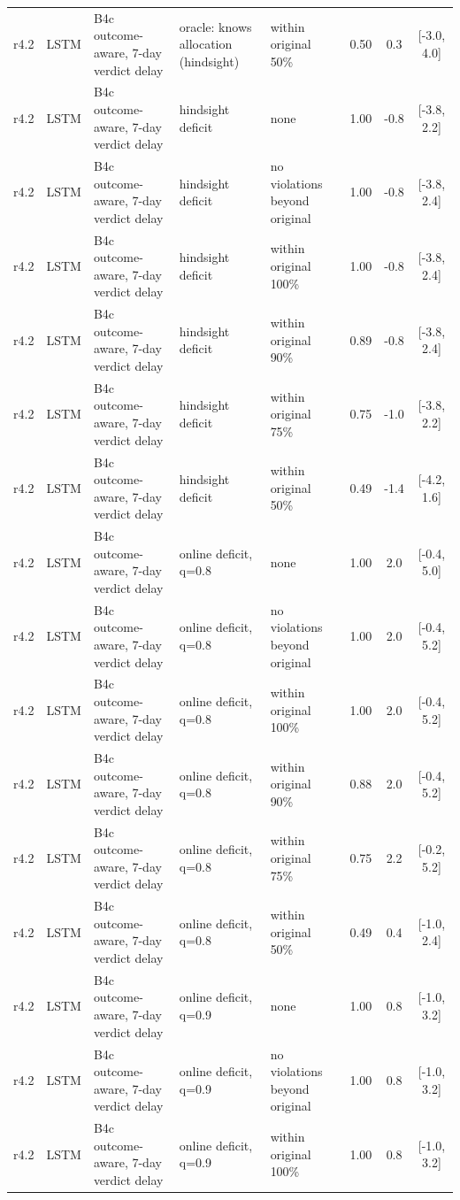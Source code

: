 \begin{longtable}{lllp{4.2cm}p{3.4cm}ccc}
r4.2 & LSTM & B4c outcome-aware, 7-day verdict delay & oracle: knows allocation (hindsight) & within original 50\% & 0.50 & 0.3 & [-3.0, 4.0] \\
r4.2 & LSTM & B4c outcome-aware, 7-day verdict delay & hindsight deficit & none & 1.00 & -0.8 & [-3.8, 2.2] \\
r4.2 & LSTM & B4c outcome-aware, 7-day verdict delay & hindsight deficit & no violations beyond original & 1.00 & -0.8 & [-3.8, 2.4] \\
r4.2 & LSTM & B4c outcome-aware, 7-day verdict delay & hindsight deficit & within original 100\% & 1.00 & -0.8 & [-3.8, 2.4] \\
r4.2 & LSTM & B4c outcome-aware, 7-day verdict delay & hindsight deficit & within original 90\% & 0.89 & -0.8 & [-3.8, 2.4] \\
r4.2 & LSTM & B4c outcome-aware, 7-day verdict delay & hindsight deficit & within original 75\% & 0.75 & -1.0 & [-3.8, 2.2] \\
r4.2 & LSTM & B4c outcome-aware, 7-day verdict delay & hindsight deficit & within original 50\% & 0.49 & -1.4 & [-4.2, 1.6] \\
r4.2 & LSTM & B4c outcome-aware, 7-day verdict delay & online deficit, q=0.8 & none & 1.00 & 2.0 & [-0.4, 5.0] \\
r4.2 & LSTM & B4c outcome-aware, 7-day verdict delay & online deficit, q=0.8 & no violations beyond original & 1.00 & 2.0 & [-0.4, 5.2] \\
r4.2 & LSTM & B4c outcome-aware, 7-day verdict delay & online deficit, q=0.8 & within original 100\% & 1.00 & 2.0 & [-0.4, 5.2] \\
r4.2 & LSTM & B4c outcome-aware, 7-day verdict delay & online deficit, q=0.8 & within original 90\% & 0.88 & 2.0 & [-0.4, 5.2] \\
r4.2 & LSTM & B4c outcome-aware, 7-day verdict delay & online deficit, q=0.8 & within original 75\% & 0.75 & 2.2 & [-0.2, 5.2] \\
r4.2 & LSTM & B4c outcome-aware, 7-day verdict delay & online deficit, q=0.8 & within original 50\% & 0.49 & 0.4 & [-1.0, 2.4] \\
r4.2 & LSTM & B4c outcome-aware, 7-day verdict delay & online deficit, q=0.9 & none & 1.00 & 0.8 & [-1.0, 3.2] \\
r4.2 & LSTM & B4c outcome-aware, 7-day verdict delay & online deficit, q=0.9 & no violations beyond original & 1.00 & 0.8 & [-1.0, 3.2] \\
r4.2 & LSTM & B4c outcome-aware, 7-day verdict delay & online deficit, q=0.9 & within original 100\% & 1.00 & 0.8 & [-1.0, 3.2] \\

\end{longtable}
